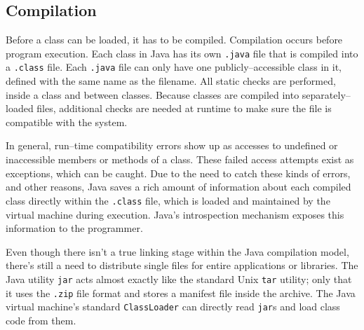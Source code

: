 \subsection{Compilation}
  Before a class can be loaded, it has to be compiled.  Compilation occurs before program execution.  Each class in Java has its own \texttt{.java} file that is compiled into a \texttt{.class} file.  Each \texttt{.java} file can only have one publicly--accessible class in it, defined with the same name as the filename.  All static checks are performed, inside a class and between classes.  Because classes are compiled into separately--loaded files, additional checks are needed at runtime to make sure the file is compatible with the system.

  In general, run--time compatibility errors show up as accesses to undefined or inaccessible members or methods of a class.  These failed access attempts exist as exceptions, which can be caught.  Due to the need to catch these kinds of errors, and other reasons, Java saves a rich amount of information about each compiled class directly within the \texttt{.class} file, which is loaded and maintained by the virtual machine during execution.  Java's introspection mechanism exposes this information to the programmer.

  Even though there isn't a true linking stage within the Java compilation model, there's still a need to distribute single files for entire applications or libraries.  The Java utility \texttt{jar} acts almost exactly like the standard Unix \texttt{tar} utility; only that it uses the \texttt{.zip} file format and stores a manifest file inside the archive.  The Java virtual machine's standard \texttt{ClassLoader} can directly read \texttt{jar}s and load class code from them.



